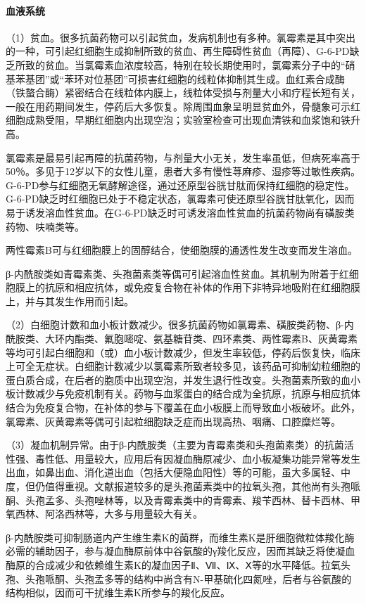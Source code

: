 \paragraph{血液系统}

（1）贫血。很多抗菌药物可以引起贫血，发病机制也有多种。氯霉素是其中突出的一种，可引起红细胞生成抑制所致的贫血、再生障碍性贫血（再障）、G-6-PD缺乏所致的贫血。当氯霉素血浓度较高，特别在较长期使用时，氯霉素分子中的“硝基苯基团”或“苯环对位基团”可损害红细胞的线粒体抑制其生成。血红素合成酶（铁螯合酶）紧密结合在线粒体内膜上，线粒体受损与剂量大小和疗程长短有关，一般在用药期间发生，停药后大多恢复。除周围血象呈明显贫血外，骨髓象可示红细胞成熟受阻，早期红细胞内出现空泡；实验室检查可出现血清铁和血浆饱和铁升高。

氯霉素是最易引起再障的抗菌药物，与剂量大小无关，发生率虽低，但病死率高于50％。多见于12岁以下的女性儿童，患者大多有慢性荨麻疹、湿疹等过敏性疾病。G-6-PD参与红细胞无氧酵解途径，通过还原型谷胱甘肽而保持红细胞的稳定性。G-6-PD缺乏时红细胞已处于不稳定状态，氯霉素可使还原型谷胱甘肽氧化，因而易于诱发溶血性贫血。在G-6-PD缺乏时可诱发溶血性贫血的抗菌药物尚有磺胺类药物、呋喃类等。

两性霉素B可与红细胞膜上的固醇结合，使细胞膜的通透性发生改变而发生溶血。

β-内酰胺类如青霉素类、头孢菌素类等偶可引起溶血性贫血。其机制为附着于红细胞膜上的抗原和相应抗体，或免疫复合物在补体的作用下非特异地吸附在红细胞膜上，并与其发生作用而引起。

（2）白细胞计数和血小板计数减少。很多抗菌药物如氯霉素、磺胺类药物、β-内酰胺类、大环内酯类、氟胞嘧啶、氨基糖苷类、四环素类、两性霉素B、灰黄霉素等均可引起白细胞和（或）血小板计数减少，但发生率较低，停药后恢复快，临床上可全无症状。白细胞计数减少以氯霉素所致者较多见，该药品可抑制幼粒细胞的蛋白质合成，在后者的胞质中出现空泡，并发生退行性改变。头孢菌素所致的血小板计数减少与免疫机制有关。药物与血浆蛋白的结合成为全抗原，抗原与相应抗体结合为免疫复合物，在补体的参与下覆盖在血小板膜上而导致血小板破坏。此外，氯霉素、灰黄霉素等偶可引起粒细胞缺乏症而出现高热、咽痛、口腔糜烂等。

（3）凝血机制异常。由于β-内酰胺类（主要为青霉素类和头孢菌素类）的抗菌活性强、毒性低、用量较大，应用后有因凝血酶原减少、血小板凝集功能异常等发生出血，如鼻出血、消化道出血（包括大便隐血阳性）等的可能，虽大多属轻、中度，但仍值得重视。文献报道较多的是头孢菌素类中的拉氧头孢，其他尚有头孢哌酮、头孢孟多、头孢唑林等，以及青霉素类中的青霉素、羧苄西林、替卡西林、甲氧西林、阿洛西林等，大多与用量较大有关。

β-内酰胺类可抑制肠道内产生维生素K的菌群，而维生素K是肝细胞微粒体羧化酶必需的辅助因子，参与凝血酶原前体中谷氨酸的γ羧化反应，因而其缺乏将使凝血酶原的合成减少和依赖维生素K的凝血因子Ⅱ、Ⅶ、Ⅸ、Ⅹ等的水平降低。拉氧头孢、头孢哌酮、头孢孟多等的结构中尚含有N-甲基硫化四氮唑，后者与谷氨酸的结构相似，因而可干扰维生素K所参与的羧化反应。

